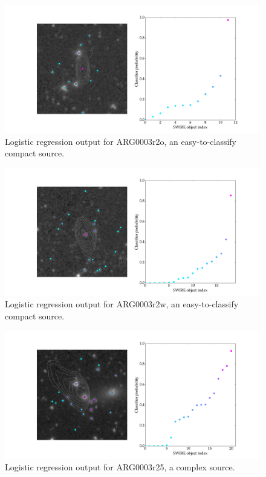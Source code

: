\documentclass[a4paper]{article}
\begin{document}
    \begin{figure}[!ht]
      \centering
      \includegraphics[width=\linewidth]{images/ARG0003r2o_lr.pdf}
      \caption{Logistic regression output for ARG0003r2o, an easy-to-classify compact source.}
      \label{fig:ARG0003r2o_lr}
    \end{figure}

    \begin{figure}[!ht]
      \centering
      \includegraphics[width=\linewidth]{images/ARG0003r2w_lr.pdf}
      \caption{Logistic regression output for ARG0003r2w, an easy-to-classify compact source.}
      \label{fig:ARG0003r2w_lr}
    \end{figure}

    \begin{figure}[!ht]
      \centering
      \includegraphics[width=\linewidth]{images/ARG0003r25_lr.pdf}
      \caption{Logistic regression output for ARG0003r25, a complex source.}
      \label{fig:ARG0003r25_lr}
    \end{figure}
\end{document}
